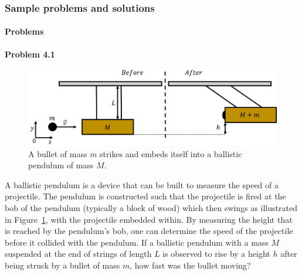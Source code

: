 \subsubsection{Sample problems and solutions}

\paragraph{Problems}

\begin{framed}
\textbf{Problem 4.1}\\
\begin{figure}[!htbp]
\centering
\includegraphics[width=0.7\linewidth]{files/ballistic-469d6db369fd5a1d3f5f71a368e7d9d4.png}
\caption[]{A bullet of mass $m$ strikes and embeds itself into a ballistic pendulum of mass $M$.}
\label{fig:momentumandcm:ballistic}
\end{figure}

A ballistic pendulum is a device that can be built to measure the speed of a projectile. The pendulum is constructed such that the projectile is fired at the bob of the pendulum (typically a block of wood) which then swings as illustrated in Figure~\ref{fig:momentumandcm:ballistic}, with the projectile embedded within. By measuring the height that is reached by the pendulum's bob, one can determine the speed of the projectile before it collided with the pendulum. If a ballistic pendulum with a mass $M$ suspended at the end of strings of length $L$ is observed to rise by a height $h$ after being struck by a bullet of mass $m$, how fast was the bullet moving?
\end{framed}


